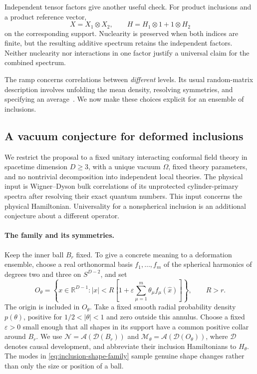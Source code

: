 \documentclass[a4paper,11pt]{article}
\theoremstyle{definition}
\begin{document}
Independent tensor factors give another useful check. For product inclusions and a product reference vector,
\begin{equation}
 X=X_1\otimes X_2,
 \qquad H=H_1\otimes1+1\otimes H_2
 \label{eq:inclusion-tensor-product}
\end{equation}
on the corresponding support. Nuclearity is preserved when both indices are finite, but the resulting additive spectrum retains the independent factors. Neither nuclearity nor interactions in one factor justify a universal claim for the combined spectrum.

The ramp concerns correlations between \emph{different} levels. Its usual random-matrix description involves unfolding the mean density, resolving symmetries, and specifying an average~\cite{Cotler2017,CipolloniErdosSchroder2023}. We now make these choices explicit for an ensemble of inclusions.

\subsection{A vacuum conjecture for deformed inclusions}

We restrict the proposal to a fixed unitary interacting conformal field theory in spacetime dimension $D\ge3$, with a unique vacuum $\Omega$, fixed theory parameters, and no nontrivial decomposition into independent local theories. The physical input is Wigner--Dyson bulk correlations of its unprotected cylinder-primary spectra after resolving their exact quantum numbers. This input concerns the physical Hamiltonian. Universality for a nonspherical inclusion is an additional conjecture about a different operator.

\paragraph{The family and its symmetries.}
Keep the inner ball $B_r$ fixed. To give a concrete meaning to a deformation ensemble, choose a real orthonormal basis $f_1,\ldots,f_m$ of the spherical harmonics of degrees two and three on $S^{D-2}$, and set
\begin{equation}
 O_\theta=\left\{x\in\mathbb R^{D-1}:
 |x|<R\left[1+\varepsilon\sum_{\mu=1}^m
             \theta_\mu f_\mu(\widehat x)\right]\right\},
 \qquad R>r.
 \label{eq:inclusion-shape-family}
\end{equation}
The origin is included in $O_\theta$. Take a fixed smooth radial probability density $p(\theta)$, positive for $1/2<|\theta|<1$ and zero outside this annulus. Choose a fixed $\varepsilon>0$ small enough that all shapes in its support have a common positive collar around $B_r$. We use
$\mathcal N=\mathcal A(\mathcal D(B_r))$ and
$\mathcal M_\theta=\mathcal A(\mathcal D(O_\theta))$,
where $\mathcal D$ denotes causal development, and abbreviate their inclusion Hamiltonians to $H_\theta$. The modes in \eqref{eq:inclusion-shape-family} sample genuine shape changes rather than only the size or position of a ball.
\end{document}
